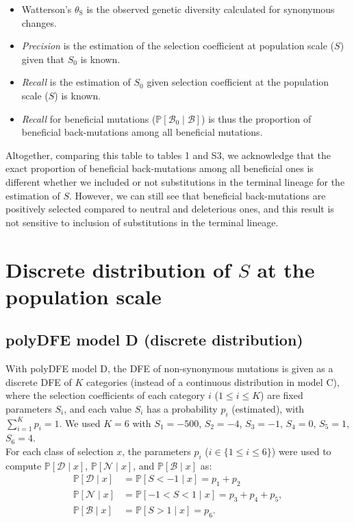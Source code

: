 \documentclass{article}
\newcommand{\proba}{\mathbb{P}}
\newcommand{\Sphy}{S_{0}}
\newcommand{\SphyBen}{\mathcal{B}_0}
\newcommand{\Sphyclass}{x}
\newcommand{\given}{\mid}
\newcommand{\Spop}{S}
\newcommand{\SpopDel}{\mathcal{D}}
\newcommand{\SpopNeu}{\mathcal{N}}
\newcommand{\SpopBen}{\mathcal{B}}
\newcommand{\thetaSyn}{\theta_{\text{S}}}
\begin{document}
    \begin{itemize}
        \item Watterson's $\thetaSyn$ is the observed genetic diversity calculated for synonymous changes.
        \item \textit{Precision} is the estimation of the selection coefficient at population scale ($\Spop$) given that $\Sphy$ is known.
        \item  \textit{Recall} is the estimation of $\Sphy$ given selection coefficient at the population scale ($\Spop$) is known.
        \item \textit{Recall} for beneficial mutations ($\proba [\SphyBen \given \SpopBen]$) is thus the proportion of beneficial back-mutations among all beneficial mutations.
    \end{itemize}

    Altogether, comparing this table to tables 1 and S3, we acknowledge that the exact proportion of beneficial back-mutations among all beneficial ones is different whether we included or not substitutions in the terminal lineage for the estimation of $\Spop$.
    However, we can still see that beneficial back-mutations are positively selected compared to neutral and deleterious ones, and this result is not sensitive to inclusion of substitutions in the terminal lineage.

    \newpage
    \section{Discrete distribution of $\Spop$ at the population scale}

    \subsection{polyDFE model D (discrete distribution)}
    With polyDFE model D, the DFE of non-synonymous mutations is given as a discrete DFE of $K$ categories (instead of a continuous distribution in model C), where the selection coefficients of each category $i$ ($1 \leq i \leq K$) are fixed parameters $\Spop_i$, and each value $\Spop_i$ has a probability $p_i$ (estimated), with $\sum_{i=1}^{K} p_i =1$.
    We used $K=6$ with $\Spop_1 = -500$, $\Spop_2 = -4$, $\Spop_3 =-1$, $\Spop_4 = 0$, $\Spop_5 = 1$, $\Spop_6 = 4$.\\
    For each class of selection $\Sphyclass$, the parameters $p_i$ ($i \in \{ 1 \leq i \leq 6 \}$) were used to compute $\proba [ \SpopDel \given  \Sphyclass] $, $\proba [ \SpopNeu \given \Sphyclass]$, and $\proba [ \SpopBen \given \Sphyclass]$ as:
    \begin{align}
        \proba [ \SpopDel \given  \Sphyclass] &= \proba [ \Spop < -1 \given \Sphyclass ] = p_1 + p_2 \label{eq:polyProbaDel-mD} \\
        \proba [ \SpopNeu \given \Sphyclass] &= \proba [ -1 < \Spop < 1 \given \Sphyclass ] = p_3 + p_4 + p_5,  \\
        \proba [ \SpopBen \given \Sphyclass] &= \proba [  \Spop > 1 \given \Sphyclass ] = p_6.  \label{eq:polyProbaAdv-mD}
    \end{align}
\end{document}
